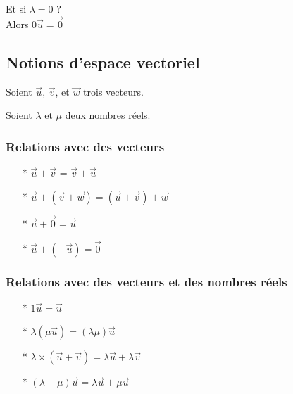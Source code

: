 Et si $\lambda = 0$ ? \\

Alors $0\overrightarrow{u} = \overrightarrow{0}$

\subsection{Notions d'espace vectoriel}

Soient $\overrightarrow{u}$, $\overrightarrow{v}$, et  $\overrightarrow{w}$ trois vecteurs.

Soient $\lambda$ et $\mu$ deux nombres réels. \\

\subsubsection{Relations avec des vecteurs}

\begin{itemize}
\item[*] $\overrightarrow{u} + \overrightarrow{v}$ = $\overrightarrow{v} + \overrightarrow{u}$
\item[*] $\overrightarrow{u} + \left(\overrightarrow{v} + \overrightarrow{w} \right) = \left( \overrightarrow{u} + \overrightarrow{v} \right) + \overrightarrow{w}$
\item[*] $\overrightarrow{u} + \overrightarrow{0} = \overrightarrow{u}$
\item[*] $\overrightarrow{u} + \left(-\overrightarrow{u}\right) = \overrightarrow{0}$
\end{itemize}

\subsubsection{Relations avec des vecteurs et des nombres réels}

\begin{itemize}
\item[*]$1\overrightarrow{u} = \overrightarrow{u}$
\item[*]$\lambda\left(\mu \overrightarrow{u} \right) = \left(\lambda\mu\right)\overrightarrow{u}$
\item[*] $\lambda \times \left( \overrightarrow{u} + \overrightarrow{v}\right) = \lambda \overrightarrow{u} + \lambda \overrightarrow{v}$
\item[*] $\left(\lambda + \mu \right) \overrightarrow{u} = \lambda \overrightarrow{u} + \mu \overrightarrow{u}$
\end{itemize}

